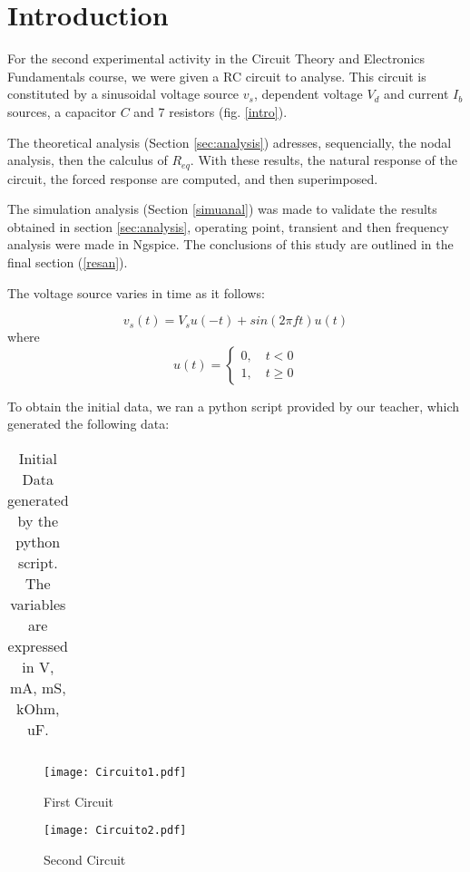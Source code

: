 \section{Introduction}

For the second experimental activity in the Circuit Theory and Electronics Fundamentals course, we were given a RC circuit to analyse.
This circuit is constituted by a sinusoidal voltage source $v_s$, dependent voltage $V_d$ and current $I_b$ sources, a capacitor $C$ and 7 resistors (fig. \ref{intro}).

The theoretical analysis (Section \ref{sec:analysis}) adresses, sequencially, the nodal analysis, then the calculus of $R_{eq}$. With these results, the natural response of the circuit, the forced response are computed, and then superimposed.

The simulation analysis (Section \ref{simuanal}) was made to validate the results obtained in section \ref{sec:analysis}, operating point, transient and then frequency analysis were made in Ngspice.
The conclusions of this study are outlined in the final section (\ref{resan}).

The voltage source varies in time as it follows:



\begin{equation}
v_s(t) = V_s u(-t) + sin(2\pi ft)u(t)
\end{equation}
where
\begin{equation}
u(t)=\begin{cases} 0, \quad t<0 \\ 1, \quad t \geq 0  \end{cases}
\end{equation}


To obtain the initial data, we ran a python script provided by our teacher, which generated the following data:\\

\begin{table}[h]
\centering
\begin{tabularx}{0.6\textwidth} {
  | >{\raggedright\arraybackslash}X
  | >{\raggedleft\arraybackslash}X | }
 \hline

\end{tabularx}
\caption{Initial Data generated by the python script. The variables are expressed in V, mA, mS, kOhm, uF.}
\end{table}

\begin{figure}[ht] \centering
\texttt{[image: Circuito1.pdf]}
\caption{First Circuit}
\label{fig:snat}
\end{figure}

\begin{figure}[ht] \centering
\texttt{[image: Circuito2.pdf]}
\caption{Second Circuit}
\label{fig:snat}
\end{figure}

\clearpage
